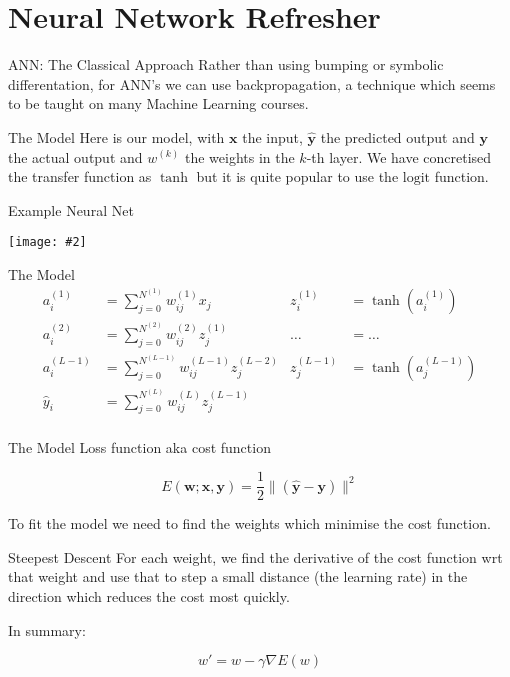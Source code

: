 \documentclass{beamer}
\newcommand {\framedgraphic}[2] {
    \begin{frame}{#1}
        \begin{center}
            \texttt{[image: \#2]}
        \end{center}
    \end{frame}
}
\begin{document}
\section{Neural Network Refresher}

\begin{frame}[fragile]{ANN: The Classical Approach}
Rather than using bumping or symbolic differentation, for ANN's we can
use backpropagation, a technique which seems to be taught on many
Machine Learning courses.
\end{frame}

\begin{frame}[fragile]{The Model}
Here is our model, with $\boldsymbol{x}$ the input,
$\hat{\boldsymbol{y}}$ the predicted output and $\boldsymbol{y}$ the
actual output and $w^{(k)}$ the weights in the $k$-th layer. We have
concretised the transfer function as $\tanh$ but it is quite popular
to use the $\text{logit}$ function.
\end{frame}

\framedgraphic{Example Neural Net}{diagrams/ca75393cd25ce951edcd7133da24a2c6.png}

\begin{frame}[fragile]{The Model}
$$
\begin{aligned}
a_i^{(1)}   &= \sum_{j=0}^{N^{(1)}} w_{ij}^{(1)} x_j       & z_i^{(1)} &= \tanh(a_i^{(1)}) \\
a_i^{(2)}   &= \sum_{j=0}^{N^{(2)}} w_{ij}^{(2)} z_j^{(1)} &  \dots     &= \ldots \\
a_i^{(L-1)} &= \sum_{j=0}^{N^{(L-1)}} w_{ij}^{(L-1)} z_j^{(L-2)} & z_j^{(L-1)} &= \tanh(a_j^{(L-1)}) \\
\hat{y}_i  &= \sum_{j=0}^{N^{(L)}} w_{ij}^{(L)} z_j^{(L-1)} \\
\end{aligned}
$$
\end{frame}

\begin{frame}[fragile]{The Model}
Loss function aka cost function

$$
E(\boldsymbol{w}; \boldsymbol{x}, \boldsymbol{y}) = \frac{1}{2}\|(\hat{\boldsymbol{y}} - \boldsymbol{y})\|^2
$$

To fit the model we need to find the weights which minimise the cost
function.
\end{frame}

\begin{frame}[fragile]{Steepest Descent}
For each weight, we find the derivative of the cost function wrt that
weight and use that to step a small distance (the learning rate) in
the direction which reduces the cost most quickly.

In summary:

$$
w' = w - \gamma\nabla E(w)
$$
\end{frame}
\end{document}
